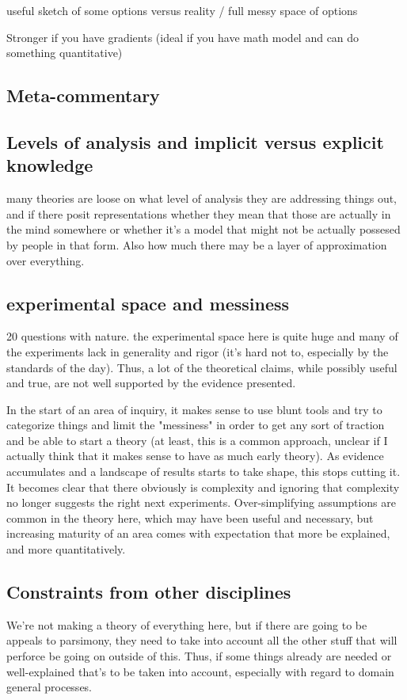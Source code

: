 \documentclass[]{article}
\begin{document}
useful sketch of some options versus reality / full messy space of options

Stronger if you have gradients (ideal if you have math model and can do something quantitative)
\subsection{Meta-commentary}
\subsection{ Levels of analysis and implicit versus explicit knowledge}
many theories are loose on what level of analysis they are addressing things out, and if there posit representations whether they mean that those are actually in the mind somewhere or whether it's a model that might not be actually possesed by people in that form. Also how much there may be a layer of approximation over everything. 

\subsection{experimental space and messiness}
20 	questions with nature. 
the experimental space here is quite huge and many of the experiments lack in generality and rigor (it's hard not to, especially by the standards of the day). Thus, a lot of the theoretical claims, while possibly useful and true, are not well supported by the evidence presented. 

In the start of an area of inquiry, it makes sense to use blunt tools and try to categorize things and limit the "messiness" in order to get any sort of traction and be able to start a theory (at least, this is a common approach, unclear if I actually think that it makes sense to have as much early theory). As evidence accumulates and a landscape of results starts to take shape, this stops cutting it. It becomes clear that there obviously is complexity and ignoring that complexity no longer suggests the right next experiments. Over-simplifying assumptions are common in the theory here, which may have been useful and necessary, but increasing maturity of an area comes with expectation that more be explained, and more quantitatively. 
\subsection{Constraints from other disciplines}
We're not making a theory of everything here, but if there are going to be appeals to parsimony, they need to take into account all the other stuff that will perforce be going on outside of this. Thus, if some things already are needed or well-explained that's to be  taken into account, especially with regard to domain general processes. 
\end{document}
